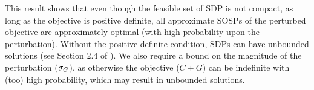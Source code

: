 This result shows that even though the feasible set of SDP is not compact, as long as the objective is positive definite, all approximate SOSPs of the perturbed objective are approximately optimal (with high probability upon the perturbation). Without the positive definite condition, SDPs can have unbounded solutions (see Section 2.4 of \citet{gartner2012approximation}). We also require a bound on the magnitude of the perturbation ($\sigma_G$), as otherwise the objective ($C+G$) can be indefinite with (too) high probability, which may result in unbounded solutions.
